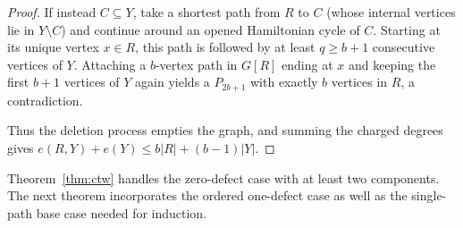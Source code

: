 \documentclass[10pt]{article}
\theoremstyle{compactplain}
\theoremstyle{remark}\newtheorem{remark}[theorem]{Remark}
\begin{document}
\begin{proof}
If instead $C\subseteq Y$, take a shortest path from $R$ to $C$ (whose
internal vertices lie in $Y\setminus C$) and continue around an opened
Hamiltonian cycle of $C$. Starting at its unique vertex $x\in R$, this
path is followed by at least $q\ge b+1$ consecutive vertices of $Y$.
Attaching a $b$-vertex path in $G[R]$ ending at $x$ and keeping the
first $b+1$ vertices of $Y$ again yields a $P_{2b+1}$ with exactly $b$
vertices in $R$, a contradiction.

Thus the deletion process empties the graph, and summing the charged
degrees gives $e(R,Y)+e(Y)\le b|R|+(b-1)|Y|$.
\end{proof}

Theorem~\ref{thm:ctw} handles the zero-defect case with at least two
components. The next theorem incorporates the ordered one-defect case as
well as the single-path base case needed for induction.
\end{document}
